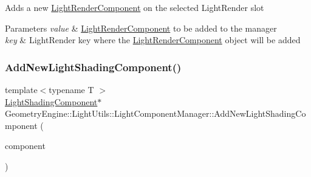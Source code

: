 Adds a new \mbox{\hyperlink{class_geometry_engine_1_1_light_utils_1_1_light_render_component}{Light\+Render\+Component}} on the selected Light\+Render slot 
\begin{DoxyParams}{Parameters}
{\em value} & \mbox{\hyperlink{class_geometry_engine_1_1_light_utils_1_1_light_render_component}{Light\+Render\+Component}} to be added to the manager \\
\hline
{\em key} & Light\+Render key where the \mbox{\hyperlink{class_geometry_engine_1_1_light_utils_1_1_light_render_component}{Light\+Render\+Component}} object will be added \\
\hline
\end{DoxyParams}
\mbox{\label{class_geometry_engine_1_1_light_utils_1_1_light_component_manager_a41569931e24cebf0285474c55f54164a}} 
\subsubsection{\texorpdfstring{AddNewLightShadingComponent()}{AddNewLightShadingComponent()}\hspace{0.1cm}{\footnotesize\ttfamily [1/2]}}
{\footnotesize\ttfamily template$<$typename T $>$ \\
\mbox{\hyperlink{class_geometry_engine_1_1_light_utils_1_1_light_shading_component}{Light\+Shading\+Component}}$\ast$ Geometry\+Engine\+::\+Light\+Utils\+::\+Light\+Component\+Manager\+::\+Add\+New\+Light\+Shading\+Component (\begin{DoxyParamCaption}\item[{\mbox{\hyperlink{namespace_geometry_engine_1_1_light_utils_a16eb370137c2fd151e6f8e1d07cd23e0}{Light\+Shading}}}]{component }\end{DoxyParamCaption})\hspace{0.3cm}{\ttfamily [inline]}}

